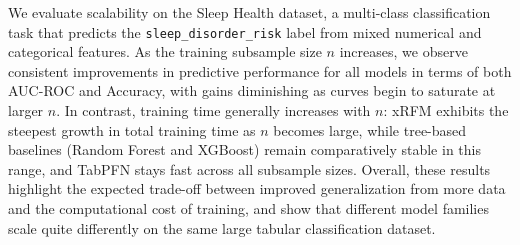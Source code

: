 We evaluate scalability on the Sleep Health dataset, a multi-class classification task that predicts the \texttt{sleep\_disorder\_risk} label from mixed numerical and categorical features. As the training subsample size $n$ increases, we observe consistent improvements in predictive performance for all models in terms of both AUC-ROC and Accuracy, with gains diminishing as curves begin to saturate at larger $n$. In contrast, training time generally increases with $n$: xRFM exhibits the steepest growth in total training time as $n$ becomes large, while tree-based baselines (Random Forest and XGBoost) remain comparatively stable in this range, and TabPFN stays fast across all subsample sizes. Overall, these results highlight the expected trade-off between improved generalization from more data and the computational cost of training, and show that different model families scale quite differently on the same large tabular classification dataset.

